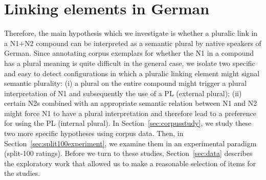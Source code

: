 \section{Linking elements in German}
\label{sec:linkingelementsingerman}


Therefore, the main hypothesis which we investigate is whether a pluralic link in a N1+N2 compound can be interpreted as a semantic plural by native speakers of German.
Since annotating corpus exemplars for whether the N1 in a compound has a plural meaning is quite difficult in the general case, we isolate two specific and easy to detect configurations in which a pluralic linking element might signal semantic plurality:
(i) a plural on the entire compound might trigger a plural interpretation of N1 and subsequently the use of a PL (external plural);
(ii) certain N2s combined with an appropriate semantic relation between N1 and N2 might force N1 to have a plural interpretation and therefore lead to a preference for using the PL (internal plural).
In Section~\ref{sec:corpusstudy}, we study these two more specific hypotheses using corpus data.
Then, in Section~\ref{sec:split100experiment}, we examine them in an experimental paradigm (split-100 ratings).
Before we turn to these studies, Section~\ref{sec:data} describes the exploratory work that allowed us to make a reasonable selection of items for the studies.
